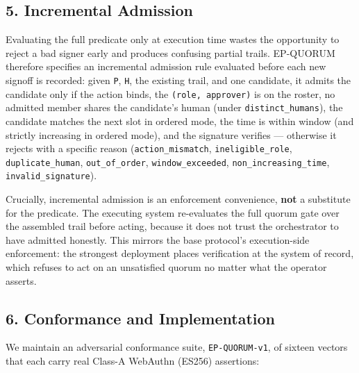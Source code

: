 \documentclass[
  11pt,
]{article}
\begin{document}
\subsection{5. Incremental Admission}\label{incremental-admission}

Evaluating the full predicate only at execution time wastes the
opportunity to reject a bad signer early and produces confusing partial
trails. EP-QUORUM therefore specifies an incremental admission rule
evaluated before each new signoff is recorded: given \texttt{P},
\texttt{H}, the existing trail, and one candidate, it admits the
candidate only if the action binds, the \texttt{(role,\ approver)} is on
the roster, no admitted member shares the candidate's human (under
\texttt{distinct\_humans}), the candidate matches the next slot in
ordered mode, the time is within window (and strictly increasing in
ordered mode), and the signature verifies --- otherwise it rejects with
a specific reason (\texttt{action\_mismatch}, \texttt{ineligible\_role},
\texttt{duplicate\_human}, \texttt{out\_of\_order},
\texttt{window\_exceeded}, \texttt{non\_increasing\_time},
\texttt{invalid\_signature}).

Crucially, incremental admission is an enforcement convenience,
\textbf{not} a substitute for the predicate. The executing system
re-evaluates the full quorum gate over the assembled trail before
acting, because it does not trust the orchestrator to have admitted
honestly. This mirrors the base protocol's execution-side enforcement:
the strongest deployment places verification at the system of record,
which refuses to act on an unsatisfied quorum no matter what the
operator asserts.

\subsection{6. Conformance and
Implementation}\label{conformance-and-implementation}

We maintain an adversarial conformance suite, \texttt{EP-QUORUM-v1}, of
sixteen vectors that each carry real Class-A WebAuthn (ES256) assertions:
\end{document}
